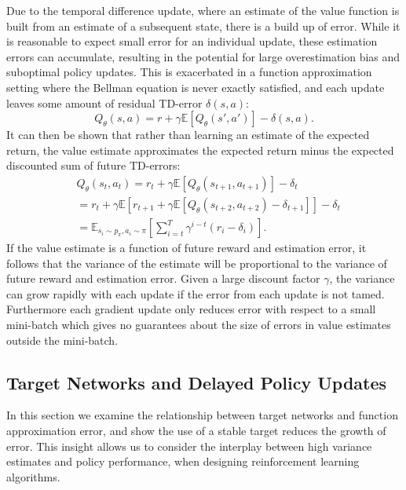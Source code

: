 \documentclass{article}
\newcommand{\y}{\gamma}
\newcommand{\E}{\mathbb{E}}
\newcommand{\lb}{\left [}
\newcommand{\rb}{\right ]}
\begin{document}
Due to the temporal difference update, where an estimate of the value function is built from an estimate of a subsequent state, there is a build up of error. While it is reasonable to expect small error for an individual update, these estimation errors can accumulate, resulting in the potential for large overestimation bias and suboptimal policy updates. This is exacerbated in a function approximation setting where the Bellman equation is never exactly satisfied, and each update leaves some amount of residual TD-error $\delta(s,a)$:
\begin{equation} \label{eqn:residual}
Q_\theta(s, a) = r + \y \E[Q_\theta(s', a')] - \delta(s,a).
\end{equation} 
It can then be shown that rather than learning an estimate of the expected return, the value estimate approximates the expected return minus the expected discounted sum of future TD-errors:
\begin{align}
&Q_\theta(s_t, a_t) = r_t + \y  \E [ Q_\theta(s_{t+1}, a_{t+1}) ] - \delta_t \nonumber \\
&= r_t + \y \E \lb r_{t+1} + \y \E \lb Q_\theta(s_{t+2},a_{t+2}) - \delta_{t+1} \rb \rb  - \delta_t \nonumber \\
&= \E_{s_i \sim p_\pi, a_i \sim \pi} \lb \sum_{i=t}^T \y^{i-t} (r_i - \delta_i) \rb.
\end{align}
If the value estimate is a function of future reward and estimation error, it follows that the variance of the estimate will be proportional to the variance of future reward and estimation error. Given a large discount factor $\y$, the variance can grow rapidly with each update if the error from each update is not tamed. Furthermore each gradient update only reduces error with respect to a small mini-batch which gives no guarantees about the size of errors in value estimates outside the mini-batch. 

\subsection{Target Networks and Delayed Policy Updates} \label{sec:dp}

In this section we examine the relationship between target networks and function approximation error, and show the use of a stable target reduces the growth of error. This insight allows us to consider the interplay between high variance estimates and policy performance, when designing reinforcement learning algorithms. 
 
\end{document}

